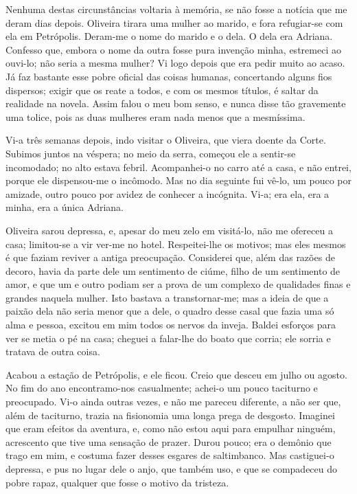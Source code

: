 Nenhuma destas circunstâncias voltaria à memória, se não fosse a notícia
que me deram dias depois. Oliveira tirara uma mulher ao marido, e fora
refugiar-se com ela em Petrópolis. Deram-me o nome do marido e o dela. O
dela era Adriana. Confesso que, embora o nome da outra fosse pura
invenção minha, estremeci ao ouvi-lo; não seria a mesma mulher? Vi logo
depois que era pedir muito ao acaso. Já faz bastante esse pobre oficial
das coisas humanas, concertando alguns fios dispersos; exigir que os
reate a todos, e com os mesmos títulos, é saltar da realidade na novela.
Assim falou o meu bom senso, e nunca disse tão gravemente uma tolice,
pois as duas mulheres eram nada menos que a mesmíssima.

Vi-a três semanas depois, indo visitar o Oliveira, que viera doente da
Corte. Subimos juntos na véspera; no meio da serra, começou ele a
sentir-se incomodado; no alto estava febril. Acompanhei-o no carro até a
casa, e não entrei, porque ele dispensou-me o incômodo. Mas no dia
seguinte fui vê-lo, um pouco por amizade, outro pouco por avidez de
conhecer a incógnita. Vi-a; era ela, era a minha, era a única Adriana.

Oliveira sarou depressa, e, apesar do meu zelo em visitá-lo, não me
ofereceu a casa; limitou-se a vir ver-me no hotel. Respeitei-lhe os
motivos; mas eles mesmos é que faziam reviver a antiga preocupação.
Considerei que, além das razões de decoro, havia da parte dele um
sentimento de ciúme, filho de um sentimento de amor, e que um e outro
podiam ser a prova de um complexo de qualidades finas e grandes naquela
mulher. Isto bastava a transtornar-me; mas a ideia de que a paixão dela
não seria menor que a dele, o quadro desse casal que fazia uma só alma e
pessoa, excitou em mim todos os nervos da inveja. Baldei esforços para
ver se metia o pé na casa; cheguei a falar-lhe do boato que corria; ele
sorria e tratava de outra coisa.

Acabou a estação de Petrópolis, e ele ficou. Creio que desceu em julho
ou agosto. No fim do ano encontramo-nos casualmente; achei-o um pouco
taciturno e preocupado. Vi-o ainda outras vezes, e não me pareceu
diferente, a não ser que, além de taciturno, trazia na fisionomia uma
longa prega de desgosto. Imaginei que eram efeitos da aventura, e, como
não estou aqui para empulhar ninguém, acrescento que tive uma sensação
de prazer. Durou pouco; era o demônio que trago em mim, e costuma fazer
desses esgares de saltimbanco. Mas castiguei-o depressa, e pus no lugar
dele o anjo, que também uso, e que se compadeceu do pobre rapaz,
qualquer que fosse o motivo da tristeza.

